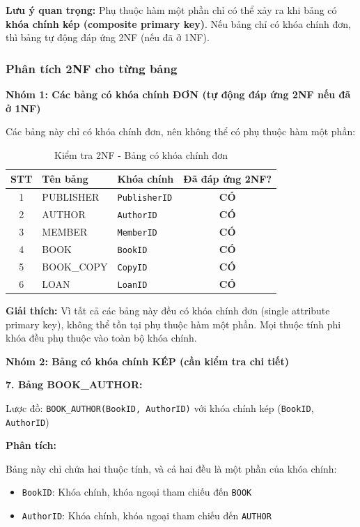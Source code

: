 \documentclass[12pt,a4paper]{article}
\begin{document}
\textbf{Lưu ý quan trọng:} Phụ thuộc hàm một phần chỉ có thể xảy ra khi bảng có \textbf{khóa chính kép (composite primary key)}. Nếu bảng chỉ có khóa chính đơn, thì bảng tự động đáp ứng 2NF (nếu đã ở 1NF).

\subsubsection{Phân tích 2NF cho từng bảng}

\textbf{Nhóm 1: Các bảng có khóa chính ĐƠN (tự động đáp ứng 2NF nếu đã ở 1NF)}

Các bảng này chỉ có khóa chính đơn, nên không thể có phụ thuộc hàm một phần:

\begin{table}[H]
\centering
\caption{Kiểm tra 2NF - Bảng có khóa chính đơn}
\begin{tabular}{|c|l|l|c|}
\hline
\textbf{STT} & \textbf{Tên bảng} & \textbf{Khóa chính} & \textbf{Đã đáp ứng 2NF?} \\ \hline
1 & PUBLISHER & \texttt{PublisherID} & \textbf{CÓ} \\ \hline
2 & AUTHOR & \texttt{AuthorID} & \textbf{CÓ} \\ \hline
3 & MEMBER & \texttt{MemberID} & \textbf{CÓ} \\ \hline
4 & BOOK & \texttt{BookID} & \textbf{CÓ} \\ \hline
5 & BOOK\_COPY & \texttt{CopyID} & \textbf{CÓ} \\ \hline
6 & LOAN & \texttt{LoanID} & \textbf{CÓ} \\ \hline
\end{tabular}
\end{table}

\textbf{Giải thích:} Vì tất cả các bảng này đều có khóa chính đơn (single attribute primary key), không thể tồn tại phụ thuộc hàm một phần. Mọi thuộc tính phi khóa đều phụ thuộc vào toàn bộ khóa chính.

\vspace{0.3cm}

\textbf{Nhóm 2: Bảng có khóa chính KÉP (cần kiểm tra chi tiết)}

\textbf{7. Bảng BOOK\_AUTHOR:}

Lược đồ: \texttt{BOOK\_AUTHOR(BookID, AuthorID)} với khóa chính kép (\texttt{BookID}, \texttt{AuthorID})

\textbf{Phân tích:}

Bảng này chỉ chứa hai thuộc tính, và cả hai đều là một phần của khóa chính:
\begin{itemize}
    \item \texttt{BookID}: Khóa chính, khóa ngoại tham chiếu đến \texttt{BOOK}
    \item \texttt{AuthorID}: Khóa chính, khóa ngoại tham chiếu đến \texttt{AUTHOR}
\end{itemize}
\end{document}
